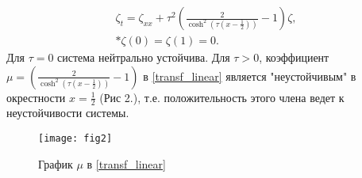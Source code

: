 \begin{gather} \label{transf_linear}
    \zeta_t = \zeta_{xx} + \tau^2 \left( \frac{2}{\cosh^2(\tau(x -
    \frac{1}{2}))} - 1 \right) \zeta, \\* 
    \zeta(0) = \zeta(1) = 0.
\end{gather}
Для $\tau = 0$ система нейтрально устойчива. Для $\tau > 0$, коэффициент 
$\mu = \left(\frac{2}{\cosh^2(\tau(x - \frac{1}{2}))} - 1 \right)$  в 
\eqref{transf_linear} является "неустойчивым" в окрестности 
$x = \frac{1}{2}$ (Рис 2.), т.е. положительность этого члена ведет к
неустойчивости системы.


\begin{figure}[H]
    \centering
    \texttt{[image: fig2]}
    \caption{График $\mu$ в \eqref{transf_linear}}
\end{figure}
